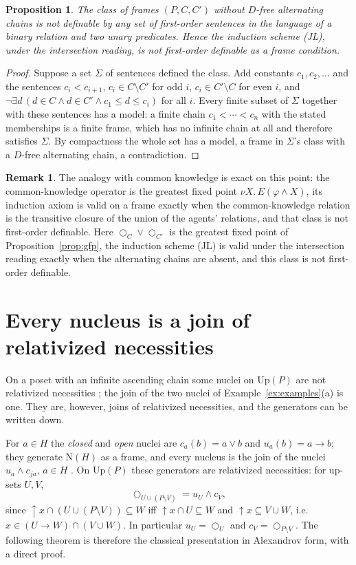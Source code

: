 \documentclass[11pt]{amsart}
\newtheorem{prop}[thm]{Proposition}
\theoremstyle{definition}
\newtheorem{rem}[thm]{Remark}
\newcommand{\Up}{\mathrm{Up}}
\newcommand{\Nuc}{\mathrm{N}}
\newcommand{\lax}{\bigcirc}
\newcommand{\upa}{{\uparrow}}
\begin{document}
\begin{prop}\label{prop:nonfo}
The class of frames $(P,C,C')$ without $D$-free alternating chains is not
definable by any set of first-order sentences in the language of a binary
relation and two unary predicates. Hence the induction scheme (JL), under the
intersection reading, is not first-order definable as a frame condition.
\end{prop}
\begin{proof}
Suppose a set $\Sigma$ of sentences defined the class. Add constants
$c_1,c_2,\dots$ and the sentences $c_i<c_{i+1}$, $c_i\in C\setminus C'$ for
odd $i$, $c_i\in C'\setminus C$ for even $i$, and
$\neg\exists d\,(d\in C\wedge d\in C'\wedge c_1\le d\le c_i)$ for all $i$.
Every finite subset of $\Sigma$ together with these sentences has a model: a
finite chain $c_1<\cdots<c_n$ with the stated memberships is a finite frame,
which has no infinite chain at all and therefore satisfies $\Sigma$. By
compactness the whole set has a model, a frame in $\Sigma$'s class with a
$D$-free alternating chain, a contradiction.
\end{proof}

\begin{rem}
The analogy with common knowledge \cite{HM} is exact on this point: the
common-knowledge operator is the greatest fixed point $\nu X.\,E(\varphi\wedge
X)$, its induction axiom is valid on a frame exactly when the common-knowledge
relation is the transitive closure of the union of the agents' relations, and
that class is not first-order definable. Here $\lax_C\vee\lax_{C'}$ is the
greatest fixed point of Proposition~\ref{prop:gfp}, the induction scheme (JL)
is valid under the intersection reading exactly when the alternating chains
are absent, and this class is not first-order definable.
\end{rem}

\section{Every nucleus is a join of relativized necessities}\label{sec:dense}

On a poset with an infinite ascending chain some nuclei on $\Up(P)$ are not
relativized necessities \cite[Thm.~2.12]{Lindenhovius}; the join of the two
nuclei of Example~\ref{ex:examples}(a) is one. They are, however, joins of
relativized necessities, and the generators can be written down.

For $a\in H$ the \emph{closed} and \emph{open} nuclei are $c_a(b)=a\vee b$
and $u_a(b)=a\to b$; they generate $\Nuc(H)$ as a frame, and every nucleus
is the join of the nuclei $u_a\wedge c_{ja}$, $a\in H$ \cite[Ch.~II, \S2]{Johnstone}.
On $\Up(P)$ these generators are relativized necessities: for up-sets $U,V$,
\[
\lax_{U\cup(P\setminus V)}=u_U\wedge c_V,
\]
since $\upa x\cap(U\cup(P\setminus V))\subseteq W$ iff $\upa x\cap U\subseteq W$
and $\upa x\subseteq V\cup W$, i.e.\ $x\in(U\to W)\cap(V\cup W)$. In
particular $u_U=\lax_U$ and $c_V=\lax_{P\setminus V}$. The following
theorem is therefore the classical presentation in Alexandrov form, with a
direct proof.
\end{document}
